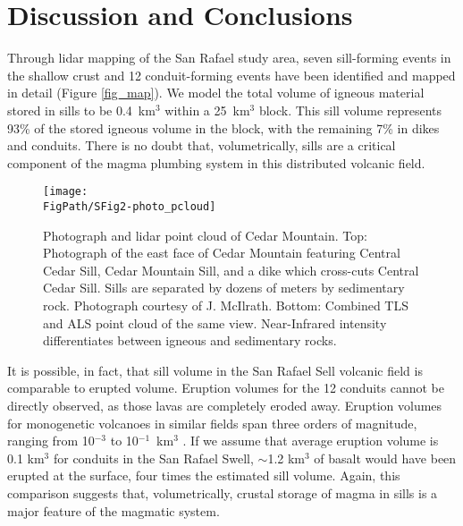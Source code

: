 \section{Discussion and Conclusions}

Through lidar mapping of the San Rafael study area, seven sill-forming events in the shallow crust and 12 conduit-forming events have been identified and mapped in detail (Figure \ref{fig_map}). We model the total volume of igneous material stored in sills to be 0.4~km$^3$ within a 25~km$^3$ block. This sill volume represents 93\% of the stored igneous volume in the block, with the remaining 7\% in dikes and conduits. There is no doubt that, volumetrically, sills are a critical component of the magma plumbing system in this distributed volcanic field.

\begin{figure}
\centering
\texttt{[image: \\FigPath/SFig2-photo\_pcloud]}
\caption[Photograph and lidar point cloud of Cedar Mountain]{Photograph and lidar point cloud of Cedar Mountain. Top: Photograph of the east face of Cedar Mountain featuring Central Cedar Sill, Cedar Mountain Sill, and a dike which cross-cuts Central Cedar Sill. Sills are separated by dozens of meters by sedimentary rock. Photograph courtesy of J. McIlrath. Bottom: Combined TLS and ALS point cloud of the same view. Near-Infrared intensity differentiates between igneous and sedimentary rocks.}
\label{fig_photo-pcloud}
\end{figure}

It is possible, in fact, that sill volume in the San Rafael Sell volcanic field is comparable to erupted volume. Eruption volumes for the 12 conduits cannot be directly observed, as those lavas are completely eroded away. Eruption volumes for monogenetic volcanoes in similar fields span three orders of magnitude, ranging from 10$^{-3}$ to 10$^{-1}$~km$^3$ \citep[e.g.]{crowe1983aspects, condit1989patterns, kiyosugi2012relationship}. If we assume that average eruption volume is 0.1 km$^3$ for conduits in the San Rafael Swell, $\sim$1.2 km$^3$ of basalt would have been erupted at the surface, four times the estimated sill volume. Again, this comparison suggests that, volumetrically, crustal storage of magma in sills is a major feature of the magmatic system.


